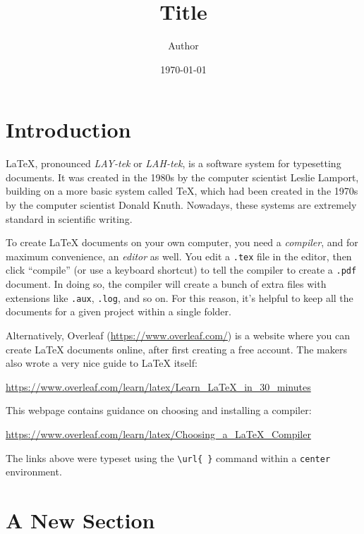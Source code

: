 \documentclass[a4paper,10pt,leqno]{article}
\numberwithin{equation}{section}
\theoremstyle{plain}
\theoremstyle{definition}
\theoremstyle{remark}
\begin{document}
\title{Title}
\author{Author}
\date{\today} %
\maketitle

\thispagestyle{empty}



\section{Introduction}

\LaTeX{}, pronounced \emph{LAY-tek} or \emph{LAH-tek}, is a software system for typesetting documents.
It was created in the 1980s by the computer scientist Leslie Lamport, building on a more basic system called \TeX{}, which had been created in the 1970s by the computer scientist Donald Knuth.
Nowadays, these systems are extremely standard in scientific writing.

To create \LaTeX{} documents on your own computer, you need a \emph{compiler}, and for maximum convenience, an \emph{editor} as well.
You edit a \texttt{.tex} file in the editor, then click ``compile'' (or use a keyboard shortcut) to tell the compiler to create a \texttt{.pdf} document.
In doing so, the compiler will create a bunch of extra files with extensions like \texttt{.aux}, \texttt{.log}, and so on.
For this reason, it's helpful to keep all the documents for a given project within a single folder.

Alternatively, Overleaf (\url{https://www.overleaf.com/}) is a website where you can create \LaTeX{} documents online, after first creating a free account.
The makers also wrote a very nice guide to \LaTeX{} itself:
\begin{center}  \url{https://www.overleaf.com/learn/latex/Learn_LaTeX_in_30_minutes}
\end{center}
This webpage contains guidance on choosing and installing a compiler:
\begin{center}
\url{https://www.overleaf.com/learn/latex/Choosing_a_LaTeX_Compiler}
\end{center}
The links above were typeset using the \texttt{\textbackslash{}url\{ \}} command within a \texttt{center} environment.

\section{A New Section}
\end{document}
